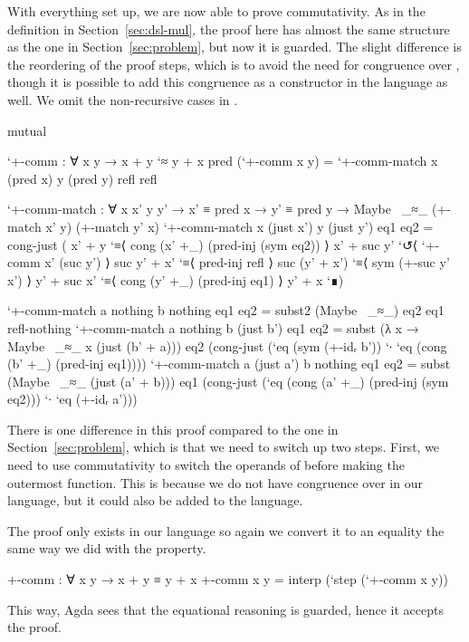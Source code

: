 With everything set up, we are now able to prove commutativity. As in the
definition in Section~\ref{sec:dsl-mul}, the proof here has almost the same
structure as the one in Section~\ref{sec:problem}, but now it is guarded. The
slight difference is the reordering of the proof steps, which is to avoid the
need for congruence over , though it is possible
to add this congruence as a constructor in the language as well. We omit the
non-recursive cases in .
\begin{code}[hide]
mutual
\end{code}
\begin{code}
  `+-comm : ∀ x y → x + y `≈ y + x
  pred (`+-comm x y) =
    `+-comm-match x (pred x) y (pred y) refl refl

  `+-comm-match :
    ∀ x x' y y' → x' ≡ pred x → y' ≡ pred y →
    Maybe~ _≈_ (+-match x' y) (+-match y' x)
  `+-comm-match x (just x') y (just y') eq1 eq2 =
    cong-just
      ( x' + y         `≡⟨ cong (x' +_) (pred-inj (sym eq2)) ⟩
        x' + suc y'    `↺⟨ `+-comm x' (suc y') ⟩
        suc y' + x'    `≡⟨ pred-inj refl ⟩
        suc (y' + x')  `≡⟨ sym (+-suc y' x') ⟩
        y' + suc x'    `≡⟨ cong (y' +_) (pred-inj eq1) ⟩
        y' + x         `∎)
\end{code}
\begin{code}[hide]
  `+-comm-match a nothing b nothing eq1 eq2 = subst2 (Maybe~ _≈_) eq2 eq1 refl-nothing
  `+-comm-match a nothing b (just b') eq1 eq2 = subst (λ x → Maybe~ _≈_ x (just (b' + a))) eq2 (cong-just (`eq (sym (+-idᵣ b')) `∙ `eq (cong (b' +_) (pred-inj eq1))))
  `+-comm-match a (just a') b nothing eq1 eq2 = subst (Maybe~ _≈_ (just (a' + b))) eq1 (cong-just (`eq (cong (a' +_) (pred-inj (sym eq2))) `∙ `eq (+-idᵣ a')))
\end{code}
There is one difference in this proof compared to the one in
Section~\ref{sec:problem}, which is that we need to switch up two steps. First,
we need to use commutativity to switch the operands of \AgdaFunction{\_+\_}
before making  the outermost function. This is because we do
not have congruence over  in our language, but it could also
be added to the language.

The proof only exists in our language so again we convert it to an equality the
same way we did with the  property.
\begin{code}
+-comm : ∀ x y → x + y ≡ y + x
+-comm x y = interp (`step (`+-comm x y))
\end{code}
This way, Agda sees that the equational reasoning is guarded, hence it accepts
the proof.

